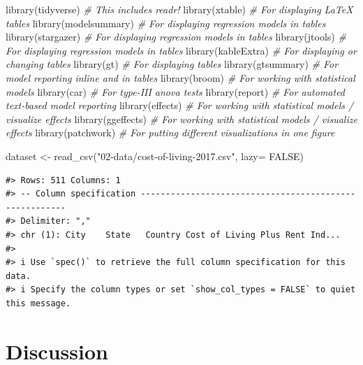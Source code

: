 \documentclass[
  11pt,
  a4paper,
  twoside]{scrbook}
\newenvironment{Shaded}{\begin{snugshade}}{\end{snugshade}}
\newcommand{\AttributeTok}[1]{\textcolor[rgb]{0.77,0.63,0.00}{#1}}
\newcommand{\CommentTok}[1]{\textcolor[rgb]{0.56,0.35,0.01}{\textit{#1}}}
\newcommand{\ConstantTok}[1]{\textcolor[rgb]{0.00,0.00,0.00}{#1}}
\newcommand{\FunctionTok}[1]{\textcolor[rgb]{0.00,0.00,0.00}{#1}}
\newcommand{\NormalTok}[1]{#1}
\newcommand{\OtherTok}[1]{\textcolor[rgb]{0.56,0.35,0.01}{#1}}
\newcommand{\StringTok}[1]{\textcolor[rgb]{0.31,0.60,0.02}{#1}}
\begin{document}
\begin{Shaded}
\begin{Highlighting}[]
\FunctionTok{library}\NormalTok{(tidyverse) }\CommentTok{\# This includes readr!}
\FunctionTok{library}\NormalTok{(xtable) }\CommentTok{\# For displaying LaTeX tables}
\FunctionTok{library}\NormalTok{(modelsummary) }\CommentTok{\# For displaying regression models in tables}
\FunctionTok{library}\NormalTok{(stargazer) }\CommentTok{\# For displaying regression models in tables}
\FunctionTok{library}\NormalTok{(jtools) }\CommentTok{\# For displaying regression models in tables}
\FunctionTok{library}\NormalTok{(kableExtra) }\CommentTok{\# For displaying or changing tables}
\FunctionTok{library}\NormalTok{(gt) }\CommentTok{\# For displaying tables}
\FunctionTok{library}\NormalTok{(gtsummary) }\CommentTok{\# For model reporting inline and in tables}
\FunctionTok{library}\NormalTok{(broom) }\CommentTok{\# For working with statistical models}
\FunctionTok{library}\NormalTok{(car) }\CommentTok{\# For type{-}III anova tests}
\FunctionTok{library}\NormalTok{(report) }\CommentTok{\# For automated text{-}based model reporting}
\FunctionTok{library}\NormalTok{(effects) }\CommentTok{\# For working with statistical models / visualize effects}
\FunctionTok{library}\NormalTok{(ggeffects) }\CommentTok{\# For working with statistical models / visualize effects}
\FunctionTok{library}\NormalTok{(patchwork) }\CommentTok{\# For putting different visualizations in one figure}

\NormalTok{dataset }\OtherTok{\textless{}{-}} \FunctionTok{read\_csv}\NormalTok{(}\StringTok{"02{-}data/cost{-}of{-}living{-}2017.csv"}\NormalTok{, }\AttributeTok{lazy=} \ConstantTok{FALSE}\NormalTok{)}
\end{Highlighting}
\end{Shaded}

\linespread{1}

\begin{verbatim}
#> Rows: 511 Columns: 1
#> -- Column specification -------------------------------------------------------
#> Delimiter: ","
#> chr (1): City    State   Country Cost of Living Plus Rent Ind...
#> 
#> i Use `spec()` to retrieve the full column specification for this data.
#> i Specify the column types or set `show_col_types = FALSE` to quiet this message.
\end{verbatim}

\hypertarget{discussion-1}{%
\chapter{Discussion}\label{discussion-1}}
\end{document}
